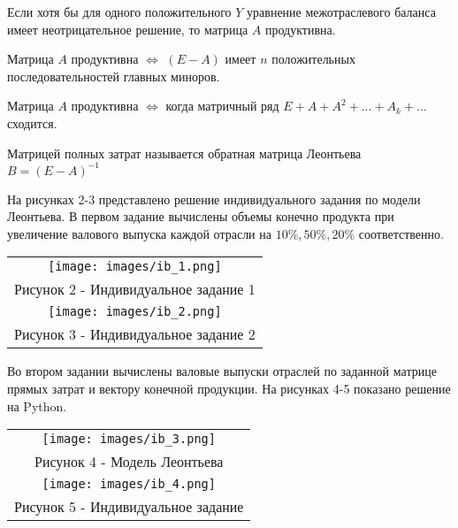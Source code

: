  \begin{definition}
   Если хотя бы для одного положительного $Y$ уравнение межотраслевого баланса имеет неотрицательное решение, то матрица $A$ продуктивна.
 \end{definition}
 \begin{definition}
  Матрица $A$ продуктивна $\iff$ $(E-A)$ имеет $n$ положительных последовательностей главных миноров.
 \end{definition}
 \begin{definition}
  Матрица $A$ продуктивна $\iff$ когда матричный ряд $E+A+A^2+...+A_k+...$ сходится.
 \end{definition}
 \begin{definition}
  Матрицей полных затрат называется обратная матрица Леонтьева $B=(E-A)^{-1}$
 \end{definition}
На рисунках 2-3 представлено решение индивидуального задания по модели Леонтьева. В первом задание вычислены объемы конечно продукта при увеличение валового выпуска каждой отрасли на $10\%,50\%,20\%$ соответственно.
 \begin{center}
   \begin{tabular}{c}
     \texttt{[image: images/ib\_1.png]}\\
     Рисунок 2 - Индивидуальное задание 1\\
     \texttt{[image: images/ib\_2.png]}\\
     Рисунок 3 - Индивидуальное задание 2
   \end{tabular}
 \end{center}
Во втором задании вычислены валовые выпуски отраслей по заданной матрице прямых затрат и вектору конечной продукции.
На рисунках 4-5 показано решение на Python.
\begin{center}
  \begin{tabular}{c}
    \texttt{[image: images/ib\_3.png]}\\
    Рисунок 4 - Модель Леонтьева\\
    \texttt{[image: images/ib\_4.png]}\\
    Рисунок 5 - Индивидуальное задание
  \end{tabular}
\end{center}
% 
